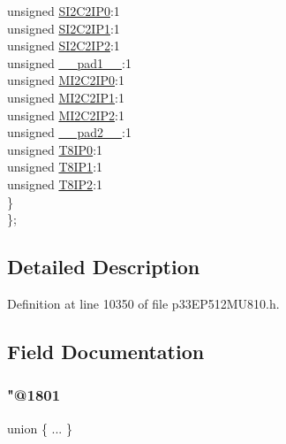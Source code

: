 \begin{DoxyCompactItemize}
\begin{tabbing}
\>\>unsigned \hyperlink{structtag_i_p_c12_b_i_t_s_af02c949a80a35f7d40d517146a176010}{SI2C2IP0}:1\\
\>\>unsigned \hyperlink{structtag_i_p_c12_b_i_t_s_a153d7a4015e762f26523fd6994231a3e}{SI2C2IP1}:1\\
\>\>unsigned \hyperlink{structtag_i_p_c12_b_i_t_s_a0d877dd606f0ba12233f6b2886329180}{SI2C2IP2}:1\\
\>\>unsigned \hyperlink{structtag_i_p_c12_b_i_t_s_acaf2d0924a107ec6e8d2e31febaf66f9}{\_\_pad1\_\_}:1\\
\>\>unsigned \hyperlink{structtag_i_p_c12_b_i_t_s_a2b21bc73d247d97057daffc1a55c27cb}{MI2C2IP0}:1\\
\>\>unsigned \hyperlink{structtag_i_p_c12_b_i_t_s_abc2c1b26a05e812fa570635b7c6ad6f3}{MI2C2IP1}:1\\
\>\>unsigned \hyperlink{structtag_i_p_c12_b_i_t_s_aa921ab68c5da4aede3c22f976ff3cc5b}{MI2C2IP2}:1\\
\>\>unsigned \hyperlink{structtag_i_p_c12_b_i_t_s_a4d97cc5f7d51d22fc2bf3eab35c9cb7f}{\_\_pad2\_\_}:1\\
\>\>unsigned \hyperlink{structtag_i_p_c12_b_i_t_s_ab54bda2c24ea48729dba1dcb274b9ffe}{T8IP0}:1\\
\>\>unsigned \hyperlink{structtag_i_p_c12_b_i_t_s_a1489d22a3008113ba4ba5399b8efd895}{T8IP1}:1\\
\>\>unsigned \hyperlink{structtag_i_p_c12_b_i_t_s_a969f225d4dd19d6e2dfc06f3d57c2f61}{T8IP2}:1\\
\>\} \\
\}; \\

\end{tabbing}\end{DoxyCompactItemize}


\subsection{Detailed Description}


Definition at line 10350 of file p33\+E\+P512\+M\+U810.\+h.



\subsection{Field Documentation}
\mbox{\label{structtag_i_p_c12_b_i_t_s_aba684dc8113ad9dc9e7533262b5f0714}} 
\subsubsection{\texorpdfstring{"@1801}{@1801}}
{\footnotesize\ttfamily union \{ ... \} }


